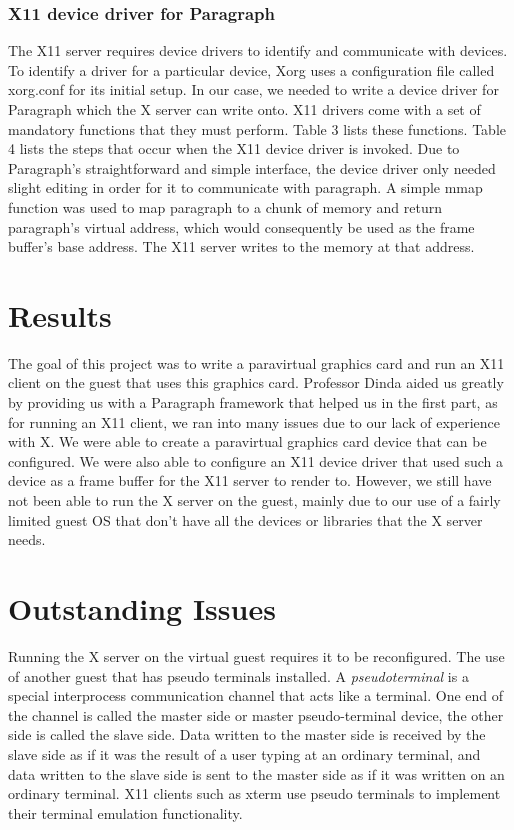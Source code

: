 \documentclass{acm_proc_article-sp}
\begin{document}
\subsubsection{X11 device driver for Paragraph}
The X11 server requires device drivers to identify and communicate with devices.
To identify a driver for a particular device, Xorg uses a configuration file called xorg.conf for its initial setup. 
In our case, we needed to write a device driver for Paragraph which the X server can
write onto.
X11 drivers come with a set of mandatory functions that they must perform. Table
3 lists these functions. Table 4 lists the steps that occur when the X11 device driver is invoked.
Due to Paragraph's straightforward and simple interface, the device driver only
needed slight editing in order for it to communicate with paragraph. A simple
mmap function was used to map paragraph to a chunk of memory and return
paragraph's virtual address, which would consequently be used as the frame
buffer's base address. The X11 server writes to the memory at that address.

\section{Results}
The goal of this project was to write a paravirtual graphics card and run an X11
client on the guest that uses this graphics card. Professor Dinda aided us
greatly by providing us with a Paragraph framework that helped us in the first
part, as for running an X11 client, we ran into many issues due to our lack of
experience with X. We were able to create a paravirtual graphics card device
that can be configured. 
We were also able to configure an X11 device driver that used such a device as a
frame buffer for the X11 server to render to. However, we still have not been able to run
the X server on the guest, mainly due to our use of a fairly limited guest OS
that don't have all the devices or libraries that the X server needs.
\section{Outstanding Issues}
Running the X server on the virtual guest requires it to be reconfigured. The
use of another guest that has pseudo terminals installed. A
\textit{pseudo\textunderscore terminal} is a special interprocess communication
channel that acts like a terminal. One end of the channel is called the master side or master pseudo-terminal device, 
the other side is called the slave side. 
Data written to the master side is received by the slave side as if it was the result of a user typing at an ordinary terminal, 
and data written to the slave side is sent to the master side as if it was written on an ordinary terminal.
X11 clients such as xterm use pseudo terminals to implement their terminal emulation functionality.
\end{document}
